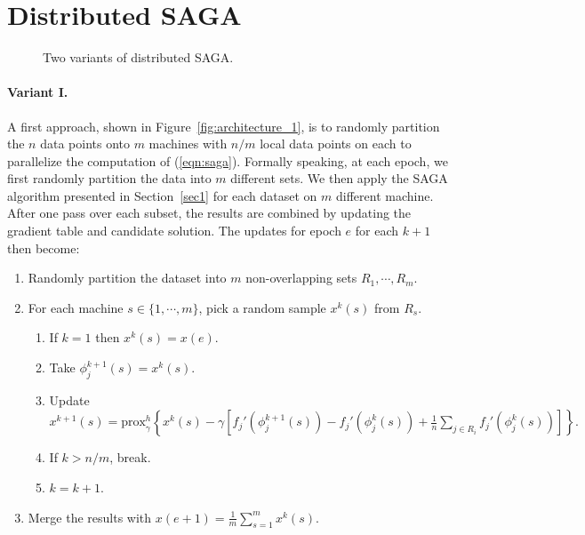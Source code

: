 \documentclass[a4paper,11pt]{article}
\newcommand{\eqnref}[1]{(\ref{eqn:#1})}
\newcommand{\figref}[1]{Figure~\ref{fig:#1}}
\newcommand{\prox}{\textrm{prox}}
\begin{document}
\section{Distributed SAGA}

\begin{figure}[ht]
	\centering
	\hspace{0pt}
	\caption{Two variants of distributed SAGA.}
	\label{2figs-show}
\end{figure}

\paragraph{Variant I.} A first approach, shown in \figref{architecture_1}, is to
randomly partition the $n$ data points onto $m$ machines with $n/m$ local data
points on each to parallelize the computation of \eqnref{saga}. Formally
speaking, at each epoch, we first randomly partition the data into $m$ different
sets. We then apply the SAGA algorithm presented in Section~\ref{sec1} for each
dataset on $m$ different machine. After one pass over each subset, the results
are combined by updating the gradient table and candidate solution. The updates
for epoch $e$ for each $k+1$ then become:
\begin{enumerate}
	\item Randomly partition the dataset into $m$ non-overlapping sets $R_1,
		\cdots, R_m$.
	\item For each machine $s \in \{ 1, \cdots, m \}$, pick a random sample
		$x^k(s)$ from $R_s$.
	\begin{enumerate}
		\item If $ k = 1 $ then $x^k(s) = x(e)$.
		\item Take $\phi_j^{k+1}(s) = x^k(s)$.
		\item Update $x^{k+1}(s) = \prox_\gamma^h \left\{ 
			x^k(s) - \gamma \left[ f_j'(\phi_j^{k+1}(s)) - f_j'(\phi_j^k(s))
			+ \frac1n \sum_{j \in R_i} f_j'(\phi_j^k(s)) \right] \right\}.$
		\item If $ k > n/m$, break.
		\item $k = k+1$.
	\end{enumerate}	
	\item Merge the results with $ x(e+1) = \frac{1}{m} \sum_{s=1}^m x^k(s)$.
\end{enumerate}
\end{document}
